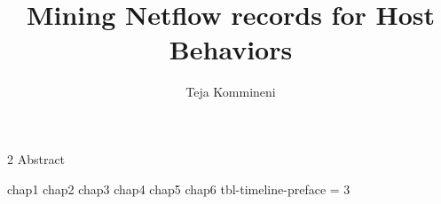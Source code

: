 \documentclass[11pt,Chicago]{uuthesis2e}
\author                 {Teja Kommineni}
\title                  {Mining Netflow records for Host Behaviors}
\begin{document}
\frontmatterformat
\titlepage
\copyrightpage
\dissertationapproval
\setcounter {page}     {2}             %
 {Abstract}


\tableofcontents
\listoffigures
\listoftables
%





\maintext       %

\pagestyle{headings} %

 {chap1}
 {chap2}
 {chap3}
 {chap4}
 {chap5}
 {chap6}
 {tbl-timeline-preface}
\numberofappendices = 3
\appendix       %

\end{document}
